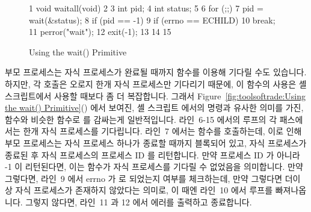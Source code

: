 \begin{figure}[tbp]
{ \scriptsize
\begin{verbbox}
  1 void waitall(void)
  2 {
  3   int pid;
  4   int status;
  5 
  6   for (;;) {
  7     pid = wait(&status);
  8     if (pid == -1) {
  9       if (errno == ECHILD)
 10         break;
 11       perror("wait");
 12       exit(-1);
 13     }
 14   }
 15 }
\end{verbbox}
}
\centering
\theverbbox
\caption{Using the wait() Primitive}
\label{fig:toolsoftrade:Using the wait() Primitive}
\end{figure}

부모 프로세스는 자식 프로세스가 완료될 때까지  함수를 이용해 기다릴
수도 있습니다.
하지만, 각  호출은 오로지 한개 자식 프로세스만 기다리기 때문에, 이
함수의 사용은 셸 스크립트에서 사용할 때보다 좀 더 복잡합니다.
그래서 Figure~\ref{fig:toolsoftrade:Using the wait()
Primitive}() 에서 보여진, 셸 스크립트 에서의  명령과
유사한 의미를 가진,  함수와 비슷한 함수로  를 감싸는게
일반적입니다.
라인~6-15 에서의 루프의 각 패스에서는 한개 자식 프로세스를 기다립니다.
라인~7 에서는  함수를 호출하는데, 이로 인해 부모 프로세스는 자식
프로세스 하나가 종료할 때까지 블록되어 있고, 자식 프로세스가 종료된 후 자식
프로세스의 프로세스 ID 를 리턴합니다.
만약 프로세스 ID 가 아니라 -1 이 리턴된다면, 이는  함수가 자식
프로세스를 기다릴 수 없었음을 의미합니다.
만약 그렇다면, 라인~9 에서 errno 가  로 되었는지 여부를 체크하는데,
만약 그렇다면 더이상 자식 프로세스가 존재하지 않았다는 의미로, 이 때엔 라인~10
에서 루프를 빠져나옵니다.
그렇지 않다면, 라인~11 과 12 에서 에러를 출력하고 종료합니다.


